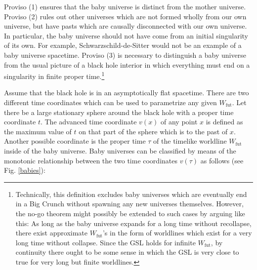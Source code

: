 \documentclass[12pt]{article}
\begin{document}
Proviso (1) ensures that the baby universe is distinct from the mother universe.  Proviso (2) rules out other universes which are not formed wholly from our own universe, but have pasts which are causally disconnected with our own universe.  In particular, the baby universe should not have come from an initial singularity of its own.  For example, Schwarzschild-de-Sitter would not be an example of a baby universe spacetime.  Proviso (3) is necessary to distinguish a baby universe from the usual picture of a black hole interior in which everything must end on a singularity in finite proper time.\footnote{Technically, this definition excludes baby universes which are eventually end in a Big Crunch without spawning any new universes themselves.  However, the no-go theorem might possibly be extended to such cases by arguing like this: As long as the baby universe expands for a long time without recollapse, there exist approximate $W_\mathrm{fut}$'s in the form of worldlines which exist for a very long time without collapse.  Since the GSL holds for infinite $W_\mathrm{fut}$, by continuity there ought to be some sense in which the GSL is very close to true for very long but finite worldlines.}

Assume that the black hole is in an asymptotically flat spacetime.  There are two different time coordinates which can be used to parametrize any given $W_\mathrm{fut}$.  Let there be a large stationary sphere around the black hole with a proper time coordinate $t$.  The advanced time coordinate $v(x)$ of any point $x$ is defined as the maximum value of $t$ on that part of the sphere which is to the past of $x$.  Another possible coordinate is the proper time $\tau$ of the timelike worldline $W_\mathrm{fut}$ inside of the baby universe.  Baby universes can be classified by means of the monotonic relationship between the two time coordinates $v(\tau)$ as follows (see Fig. \ref{babies}):
\end{document}
